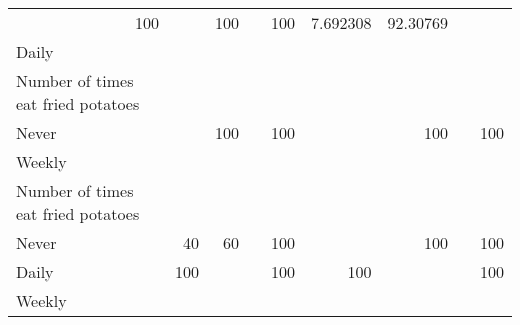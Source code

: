 \documentclass{article}
\begin{document}
\begin{tabular}{lllllllll}
  \multicolumn{1}{r}{100} &
  \multicolumn{1}{r}{} &
  \multicolumn{1}{r}{100} &
  \multicolumn{1}{r}{} &
  \multicolumn{1}{r}{100} &
  \multicolumn{1}{r}{7.692308} &
  \multicolumn{1}{r}{92.30769} \\
\multicolumn{1}{l}{\hspace{5em}Daily} &
  \multicolumn{1}{|r}{} &
  \multicolumn{1}{r}{} &
  \multicolumn{1}{r}{} &
  \multicolumn{1}{r}{} &
  \multicolumn{1}{r}{} &
  \multicolumn{1}{r}{} &
  \multicolumn{1}{r}{} &
  \multicolumn{1}{r}{} \\
\multicolumn{1}{l}{\hspace{6em}Number of times eat fried potatoes} &
  \multicolumn{1}{|r}{} &
  \multicolumn{1}{r}{} &
  \multicolumn{1}{r}{} &
  \multicolumn{1}{r}{} &
  \multicolumn{1}{r}{} &
  \multicolumn{1}{r}{} &
  \multicolumn{1}{r}{} &
  \multicolumn{1}{r}{} \\
\multicolumn{1}{l}{\hspace{7em}Never} &
  \multicolumn{1}{|r}{} &
  \multicolumn{1}{r}{100} &
  \multicolumn{1}{r}{} &
  \multicolumn{1}{r}{100} &
  \multicolumn{1}{r}{} &
  \multicolumn{1}{r}{100} &
  \multicolumn{1}{r}{} &
  \multicolumn{1}{r}{100} \\
\multicolumn{1}{l}{\hspace{5em}Weekly} &
  \multicolumn{1}{|r}{} &
  \multicolumn{1}{r}{} &
  \multicolumn{1}{r}{} &
  \multicolumn{1}{r}{} &
  \multicolumn{1}{r}{} &
  \multicolumn{1}{r}{} &
  \multicolumn{1}{r}{} &
  \multicolumn{1}{r}{} \\
\multicolumn{1}{l}{\hspace{6em}Number of times eat fried potatoes} &
  \multicolumn{1}{|r}{} &
  \multicolumn{1}{r}{} &
  \multicolumn{1}{r}{} &
  \multicolumn{1}{r}{} &
  \multicolumn{1}{r}{} &
  \multicolumn{1}{r}{} &
  \multicolumn{1}{r}{} &
  \multicolumn{1}{r}{} \\
\multicolumn{1}{l}{\hspace{7em}Never} &
  \multicolumn{1}{|r}{40} &
  \multicolumn{1}{r}{60} &
  \multicolumn{1}{r}{} &
  \multicolumn{1}{r}{100} &
  \multicolumn{1}{r}{} &
  \multicolumn{1}{r}{100} &
  \multicolumn{1}{r}{} &
  \multicolumn{1}{r}{100} \\
\multicolumn{1}{l}{\hspace{7em}Daily} &
  \multicolumn{1}{|r}{100} &
  \multicolumn{1}{r}{} &
  \multicolumn{1}{r}{} &
  \multicolumn{1}{r}{100} &
  \multicolumn{1}{r}{100} &
  \multicolumn{1}{r}{} &
  \multicolumn{1}{r}{} &
  \multicolumn{1}{r}{100} \\
\multicolumn{1}{l}{\hspace{7em}Weekly} &

\end{tabular}
\end{document}
